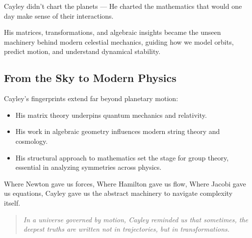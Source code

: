 \begin{tcolorbox}[colback=blue!5!white, colframe=blue!50!black, title={Cayley’s Legacy: When Algebra Became a Telescope}]
Cayley didn’t chart the planets —  
He charted the mathematics that would one day make sense of their interactions.

His matrices, transformations, and algebraic insights became the unseen machinery behind modern celestial mechanics, guiding how we model orbits, predict motion, and understand dynamical stability.
\end{tcolorbox}

\subsection*{From the Sky to Modern Physics}

Cayley’s fingerprints extend far beyond planetary motion:

\begin{itemize}
  \item His matrix theory underpins quantum mechanics and relativity.
  \item His work in algebraic geometry influences modern string theory and cosmology.
  \item His structural approach to mathematics set the stage for group theory, essential in analyzing symmetries across physics.
\end{itemize}

Where Newton gave us forces,  
Where Hamilton gave us flow,  
Where Jacobi gave us equations,  
Cayley gave us the abstract machinery to navigate complexity itself.

\begin{quote}
\textit{In a universe governed by motion,  
Cayley reminded us that sometimes, the deepest truths are written not in trajectories, but in transformations.}
\end{quote}


